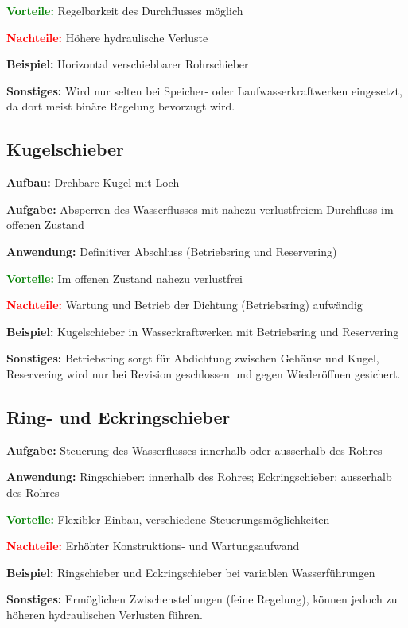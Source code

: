 \textbf{\textcolor{green}{Vorteile:}}  
Regelbarkeit des Durchflusses möglich

\textbf{\textcolor{red}{Nachteile:}}  
Höhere hydraulische Verluste

\textbf{Beispiel:}  
Horizontal verschiebbarer Rohrschieber

\textbf{Sonstiges:}  
Wird nur selten bei Speicher- oder Laufwasserkraftwerken eingesetzt, da dort meist binäre Regelung bevorzugt wird.

\subsection{Kugelschieber}
\textbf{Aufbau:}  
Drehbare Kugel mit Loch

\textbf{Aufgabe:}  
Absperren des Wasserflusses mit nahezu verlustfreiem Durchfluss im offenen Zustand

\textbf{Anwendung:}  
Definitiver Abschluss (Betriebsring und Reservering)

\textbf{\textcolor{green}{Vorteile:}}  
Im offenen Zustand nahezu verlustfrei

\textbf{\textcolor{red}{Nachteile:}}  
Wartung und Betrieb der Dichtung (Betriebsring) aufwändig

\textbf{Beispiel:}  
Kugelschieber in Wasserkraftwerken mit Betriebsring und Reservering

\textbf{Sonstiges:}  
Betriebsring sorgt für Abdichtung zwischen Gehäuse und Kugel, Reservering wird nur bei Revision geschlossen und gegen Wiederöffnen gesichert.

\subsection{Ring- und Eckringschieber}
\textbf{Aufgabe:}  
Steuerung des Wasserflusses innerhalb oder ausserhalb des Rohres

\textbf{Anwendung:}  
Ringschieber: innerhalb des Rohres; Eckringschieber: ausserhalb des Rohres

\textbf{\textcolor{green}{Vorteile:}}  
Flexibler Einbau, verschiedene Steuerungsmöglichkeiten

\textbf{\textcolor{red}{Nachteile:}}  
Erhöhter Konstruktions- und Wartungsaufwand

\textbf{Beispiel:}  
Ringschieber und Eckringschieber bei variablen Wasserführungen

\textbf{Sonstiges:}  
Ermöglichen Zwischenstellungen (feine Regelung), können jedoch zu höheren hydraulischen Verlusten führen.

